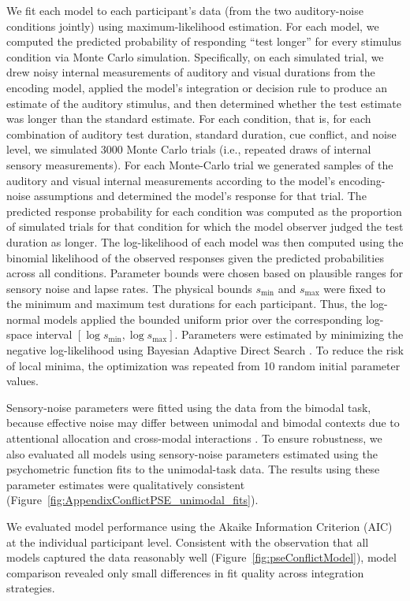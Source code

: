 \documentclass{jov}
\providecommand{\citep}[1]{\cite{#1}}
\begin{document}
We fit each model to each participant's data (from the two auditory-noise conditions jointly) using maximum-likelihood estimation. For each model, we computed the predicted probability of responding ``test longer'' for every stimulus condition via Monte Carlo simulation. Specifically, on each simulated trial, we drew noisy internal measurements of auditory and visual durations from the encoding model, applied the model's integration or decision rule to produce an estimate of the auditory stimulus, and then determined whether the test estimate was longer than the standard estimate. For each condition, that is, for each combination of auditory test duration, standard duration, cue conflict, and noise level, we simulated 3000 Monte Carlo trials (i.e., repeated draws of internal sensory measurements). For each Monte-Carlo trial we generated samples of the auditory and visual internal measurements according to the model's encoding-noise assumptions and determined the model's response for that trial. The predicted response probability for each condition was computed as the proportion of simulated trials for that condition for which the model observer judged the test duration as longer. The log-likelihood of each model was then computed using the binomial likelihood of the observed responses given the predicted probabilities across all conditions. Parameter bounds were chosen based on plausible ranges for sensory noise and lapse rates. The physical bounds $s_{\min}$ and $s_{\max}$ were fixed to the minimum and maximum test durations for each participant. Thus, the log-normal models applied the bounded uniform prior over the corresponding log-space interval $[\log s_{\min},\log s_{\max}]$. Parameters were estimated by minimizing the negative log-likelihood using Bayesian Adaptive Direct Search \citep{acerbi2017practical}. To reduce the risk of local minima, the optimization was repeated from 10 random initial parameter values.

Sensory-noise parameters were fitted using the data from the bimodal task, because effective noise may differ between unimodal and bimodal contexts due to attentional allocation and cross-modal interactions \citep{badde2020modality}. To ensure robustness, we also evaluated all models using sensory-noise parameters estimated using the psychometric function fits to the unimodal-task data. The results using these parameter estimates were qualitatively consistent (Figure~\ref{fig:AppendixConflictPSE_unimodal_fits}).

We evaluated model performance using the Akaike Information Criterion (AIC) at the individual participant level. Consistent with the observation that all models captured the data reasonably well (Figure~\ref{fig:pseConflictModel}), model comparison revealed only small differences in fit quality across integration strategies.
\end{document}

